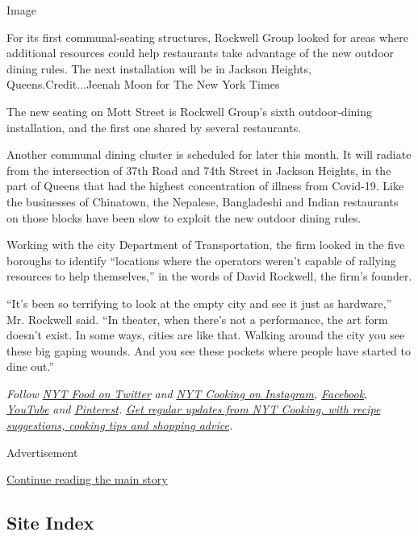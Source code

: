 Image

For its first communal-seating structures, Rockwell Group looked for
areas where additional resources could help restaurants take advantage
of the new outdoor dining rules. The next installation will be in
Jackson Heights, Queens.Credit...Jeenah Moon for The New York Times

The new seating on Mott Street is Rockwell Group's sixth outdoor-dining
installation, and the first one shared by several restaurants.

Another communal dining cluster is scheduled for later this month. It
will radiate from the intersection of 37th Road and 74th Street in
Jackson Heights, in the part of Queens that had the highest
concentration of illness from Covid-19. Like the businesses of
Chinatown, the Nepalese, Bangladeshi and Indian restaurants on those
blocks have been slow to exploit the new outdoor dining rules.

Working with the city Department of Transportation, the firm looked in
the five boroughs to identify ``locations where the operators weren't
capable of rallying resources to help themselves,'' in the words of
David Rockwell, the firm's founder.

``It's been so terrifying to look at the empty city and see it just as
hardware,'' Mr. Rockwell said. ``In theater, when there's not a
performance, the art form doesn't exist. In some ways, cities are like
that. Walking around the city you see these big gaping wounds. And you
see these pockets where people have started to dine out.''

\emph{Follow} \href{https://twitter.com/nytfood}{\emph{NYT Food on
Twitter}} \emph{and}
\href{https://www.instagram.com/nytcooking/}{\emph{NYT Cooking on
Instagram}}\emph{,}
\href{https://www.facebook.com/nytcooking/}{\emph{Facebook}}\emph{,}
\href{https://www.youtube.com/nytcooking}{\emph{YouTube}} \emph{and}
\href{https://www.pinterest.com/nytcooking/}{\emph{Pinterest}}\emph{.}
\href{https://www.nytimes.com/newsletters/cooking}{\emph{Get regular
updates from NYT Cooking, with recipe suggestions, cooking tips and
shopping advice}}\emph{.}

Advertisement

\protect\hyperlink{after-bottom}{Continue reading the main story}

\hypertarget{site-index}{%
\subsection{Site Index}\label{site-index}}

